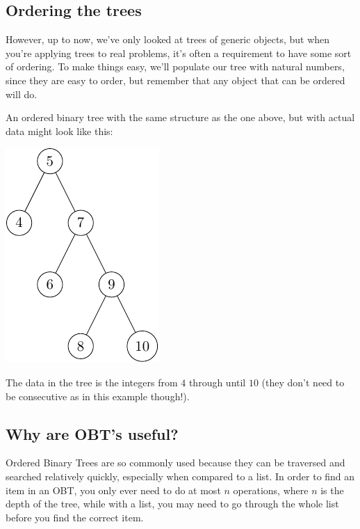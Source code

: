 \subsection*{Ordering the trees}

However, up to now, we've only looked at trees of generic objects, but when
you're applying trees to real problems, it's often a requirement to have some
sort of ordering. To make things easy, we'll populate our tree with natural
numbers, since they are easy to order, but remember that any object that can be
ordered will do.


An ordered binary tree with the same structure as the one above, but with actual
data might look like this:

\begin{center}
	\includegraphics{trees/2.pdf}
\end{center}

The data in the tree is the integers from $4$ through until $10$ (they don't
need to be consecutive as in this example though!).

\subsection*{Why are OBT's useful?}

Ordered Binary Trees are so commonly used because they can be traversed and
searched relatively quickly, especially when compared to a list. In order to
find an item in an OBT, you only ever need to do at most $n$ operations, where
$n$ is the depth of the tree, while with a list, you may need to go through the
whole list before you find the correct item.

